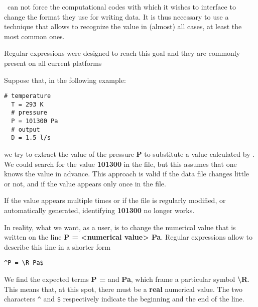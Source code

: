 \OT\ can not force the computational codes with which it wishes to interface to change the format they use for writing data. It is thus necessary to use a technique that allows to recognize the value in (almost) all cases, at least the most common ones.

Regular expressions were designed to reach this goal and they are commonly present on all current platforms%

Suppose that, in the following example:
\lstset{language=C++, basicstyle=\normalsize}
\begin{lstlisting}[frame=TBRL]
  # temperature
  T = 293 K
  # pressure
  P = 101300 Pa
  # output
  D = 1.5 l/s
\end{lstlisting}

we try to extract the value of the pressure {\bf P} to substitute a value calculated by \OT. We could search for the value {\bf 101300} in the file, but this assumes that one knows the value in advance. This approach is valid if the data file changes little or not, and if the value appears only once in the file.

If the value appears multiple times or if the file is regularly modified, or automatically generated, identifying {\bf 101300} no longer works.

In reality, what we want, as a user, is to change the numerical value that is written on the line {\bf P = <numerical value> Pa}. Regular expressions allow to describe this line in a shorter form%
\lstset{language=C++, basicstyle=\normalsize}
\begin{lstlisting}[frame=TBRL]
  ^P = \R Pa$
\end{lstlisting}

We find the expected terms {\bf P =} and {\bf Pa}, which frame a particular symbol {\bf \textbackslash R}. This means that, at this spot, there must be a {\bf real} numerical value. The two characters \verb+^+ and \verb+$+ respectively indicate the beginning and the end of the line.

